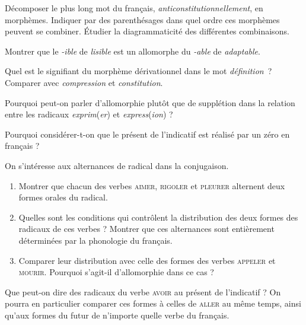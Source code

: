 {     Décomposer le plus long mot du français, \textit{anticonstitutionnellement}, en morphèmes. Indiquer par des parenthésages dans quel ordre ces morphèmes peuvent se combiner. Étudier la diagrammaticité des différentes combinaisons.

     Montrer que le \textit{{}-ible} de \textit{lisible} est un allomorphe du \textit{{}-able} de \textit{adaptable}.

     Quel est le signifiant du morphème dérivationnel dans le mot \textit{définition~}? Comparer avec \textit{compression} et \textit{constitution}.

     Pourquoi peut-on parler d’allomorphie plutôt que de supplétion dans la relation entre les radicaux \textit{exprim}(\textit{er}) et \textit{express}(\textit{ion}) ?

     Pourquoi considérer-t-on que le présent de l’indicatif est réalisé par un zéro en français ?

     On s’intéresse aux alternances de radical dans la conjugaison.
    
    \begin{enumerate}[label=\alph*.]
    \item Montrer que chacun des verbes \textsc{aimer}, \textsc{rigoler} et \textsc{pleurer} alternent deux formes orales du radical.
    \item Quelles sont les conditions qui contrôlent la distribution des deux formes des radicaux de ces verbes ? Montrer que ces alternances sont entièrement déterminées par la phonologie du français.
    \item Comparer leur distribution avec celle des formes des verbes \textsc{appeler} et \textsc{mourir}. Pourquoi s’agit-il d’allomorphie dans ce cas ?
    \end{enumerate}
    
      Que peut-on dire des radicaux du verbe \textsc{avoir} au présent de l'indicatif ? On pourra en particulier comparer ces formes à celles de \textsc{aller} au même temps, ainsi qu'aux formes du futur de n'importe quelle verbe du français.
}
